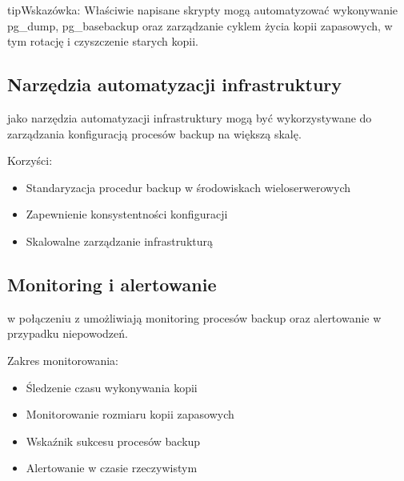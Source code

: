 \documentclass[a4paper,11pt,polish]{sphinxmanual}
\begin{document}
\begin{sphinxadmonition}{tip}{Wskazówka:}
\sphinxAtStartPar
Właściwie napisane skrypty mogą automatyzować wykonywanie pg\_dump, pg\_basebackup oraz zarządzanie cyklem życia kopii zapasowych, w tym rotację i czyszczenie starych kopii.
\end{sphinxadmonition}


\subsection{Narzędzia automatyzacji infrastruktury}
\label{\detokenize{Kopie_zapasowe_i_odzyskiwanie_danych/kopie_zapasowe_i_odzyskiwanie_danych:narzedzia-automatyzacji-infrastruktury}}
\sphinxAtStartPar
{} jako narzędzia automatyzacji infrastruktury mogą być wykorzystywane do zarządzania konfiguracją procesów backup na większą skalę.

\sphinxAtStartPar
Korzyści:
\begin{itemize}
\item {} 
\sphinxAtStartPar
Standaryzacja procedur backup w środowiskach wieloserwerowych

\item {} 
\sphinxAtStartPar
Zapewnienie konsystentności konfiguracji

\item {} 
\sphinxAtStartPar
Skalowalne zarządzanie infrastrukturą

\end{itemize}


\subsection{Monitoring i alertowanie}
\label{\detokenize{Kopie_zapasowe_i_odzyskiwanie_danych/kopie_zapasowe_i_odzyskiwanie_danych:monitoring-i-alertowanie}}
\sphinxAtStartPar
{} w połączeniu z  umożliwiają monitoring procesów backup oraz alertowanie w przypadku niepowodzeń.

\sphinxAtStartPar
Zakres monitorowania:
\begin{itemize}
\item {} 
\sphinxAtStartPar
Śledzenie czasu wykonywania kopii

\item {} 
\sphinxAtStartPar
Monitorowanie rozmiaru kopii zapasowych

\item {} 
\sphinxAtStartPar
Wskaźnik sukcesu procesów backup

\item {} 
\sphinxAtStartPar
Alertowanie w czasie rzeczywistym

\end{itemize}
\end{document}
